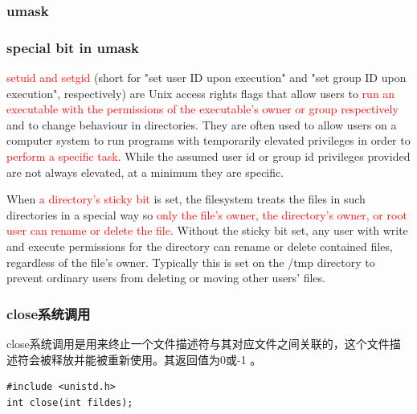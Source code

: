 \documentclass{beamer}
\begin{document}
\begin{frame}
\frametitle{umask}
\end{frame}
\begin{frame}
\frametitle{special bit in umask}
\textcolor{red}{setuid and setgid} (short for "set user ID upon execution" and "set group ID upon execution", respectively) are Unix access rights flags that allow users to \textcolor{red}{run an executable with the permissions of the executable's owner or group respectively} and to change behaviour in directories. They are often used to allow users on a computer system to run programs with temporarily elevated privileges in order to \textcolor{red}{perform a specific task}. While the assumed user id or group id privileges provided are not always elevated, at a minimum they are specific.

When \textcolor{red}{a directory's sticky bit} is set, the filesystem treats the files in such directories in a special way so \textcolor{red}{only the file's owner, the directory's owner, or root user can rename or delete the file}. Without the sticky bit set, any user with write and execute permissions for the directory can rename or delete contained files, regardless of the file's owner. Typically this is set on the /tmp directory to prevent ordinary users from deleting or moving other users' files.
\end{frame}
\begin{frame}[fragile]
\frametitle{close系统调用}
close系统调用是用来终止一个文件描述符与其对应文件之间关联的，这个文件描述符会被释放并能被重新使用。其返回值为0或-1 。
\begin{example}[close系统调用的原型]
\begin{verbatim}
#include <unistd.h>
int close(int fildes);
\end{verbatim}
\end{example}


\end{frame}
\end{document}
